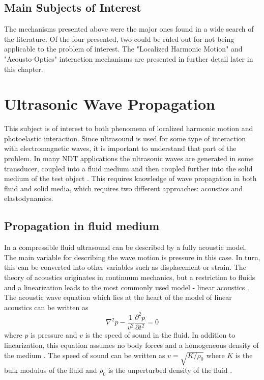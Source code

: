 \documentclass[11pt,twoside]{eitExjobb}
\begin{document}
	\subsection{Main Subjects of Interest}
	The mechanisms presented above were the major ones found in a wide search of the literature. Of the four presented, two could be ruled out for not being applicable to the problem of interest. The "Localized Harmonic Motion" and "Acousto-Optics" interaction mechanisms are presented in further detail later in this chapter.
	
	\section{Ultrasonic Wave Propagation}
	This subject is of interest to both phenomena of localized harmonic motion and photoelastic interaction. Since ultrasound is used for some type of interaction with electromagnetic waves, it is important to understand that part of the problem. In many NDT applications the ultrasonic waves are generated in some transducer, coupled into a fluid medium and then coupled further into the solid medium of the test object \cite{Schmerr2016}. This requires knowledge of wave propagation in both fluid and solid media, which requires two different approaches: acoustics and elastodynamics.	
	
	\subsection{Propagation in fluid medium}
	In a compressible fluid ultrasound can be described by a fully acoustic model. The main variable for describing the wave motion is pressure in this case. In turn, this can be converted into other variables such as displacement or strain. The theory of acoustics originates in continuum mechanics, but a restriction to fluids and a linearization leads to the most commonly used model - linear acoustics \cite{Rossing2014}. The acoustic wave equation which lies at the heart of the model of linear acoustics can be written as \cite{Rossing2014, Schmerr2016, Kaufman2000}
	\begin{equation*}
		\nabla^2 p - \frac{1}{v^2} \frac{\partial^2 p}{\partial t^2} = 0
	\end{equation*}
	where $p$ is pressure and $v$ is the speed of sound in the fluid. In addition to linearization, this equation assumes no body forces and a homogeneous density of the medium \cite{Rossing2014}. The speed of sound can be written as $v = \sqrt{K/\rho_0}$ where $K$ is the bulk modulus of the fluid and $\rho_0$ is the unperturbed density of the fluid \cite{Kaufman2000}.
	
\end{document}
